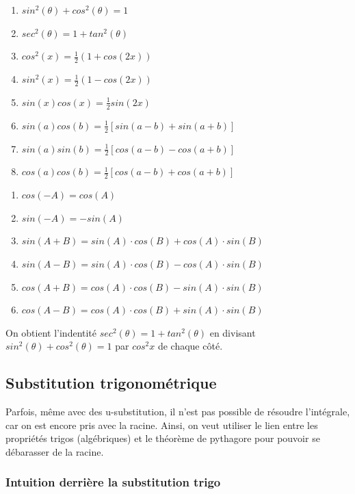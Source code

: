 \documentclass{article}
\begin{document}
\begin{theorem}
    \begin{enumerate}
	\item $ sin^2(\theta) + cos^2(\theta) = 1$
	\item $ sec^2(\theta) = 1 + tan^2(\theta) $
	\item $ cos^2(x) = \frac{1}{2} (1+cos(2x))$
	\item $ sin^2(x) = \frac{1}{2} (1-cos(2x))$
	\item $ sin(x) cos(x) = \frac{1}{2} sin(2x)$
	\item $ sin(a) cos(b) = \frac{1}{2} [sin(a-b) + sin(a+b)]$
	\item $ sin(a) sin(b) = \frac{1}{2} [cos(a-b) - cos(a+b)]$
	\item $ cos(a) cos(b) = \frac{1}{2} [cos(a-b) + cos(a+b)]$
    \end{enumerate}
    \begin{enumerate}
	\item $ cos(-A) = cos(A)$
	\item $ sin(-A)= - sin(A)$
	\item $ sin(A+B) = sin(A) \cdot cos(B) + cos(A) \cdot sin(B)$
	\item $ sin(A-B) = sin(A) \cdot cos(B) - cos(A) \cdot sin(B)$
	\item $ cos(A+B) = cos(A) \cdot cos(B) - sin(A) \cdot sin(B)$
	\item $ cos(A-B) = cos(A) \cdot cos(B) + sin(A) \cdot sin(B)$
    \end{enumerate}
\end{theorem}

\begin{remark}
    On obtient l'indentité $ sec^2(\theta) = 1 + tan^2(\theta) $ en divisant
    $ sin^2(\theta) + cos^2(\theta) = 1$ par $ cos^2x$ de chaque côté.
\end{remark}

\subsection{Substitution trigonométrique}

Parfois, même avec des u-substitution, il n'est pas possible de résoudre
l'intégrale, car on est encore pris avec la racine. Ainsi, on veut utiliser
le lien entre les propriétés trigos (algébriques) et le théorème de
pythagore pour pouvoir se débarasser de la racine.

\subsubsection{Intuition derrière la substitution trigo}%
\label{ssub:Intuition derrière la substitution trigo}
\end{document}
